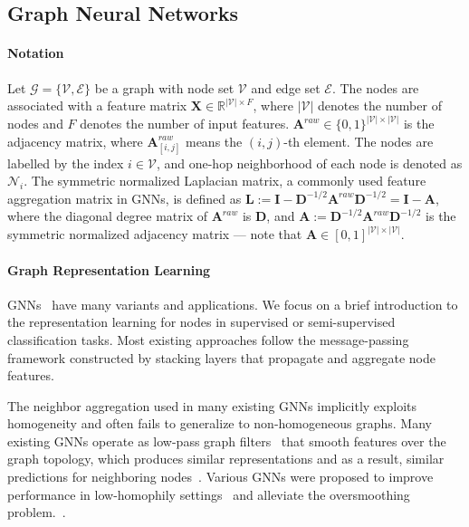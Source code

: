 \documentclass{article}
\theoremstyle{plain}
\theoremstyle{definition}
\theoremstyle{remark}
\begin{document}
\subsection{Graph Neural Networks}
\paragraph{Notation}
Let $\mathcal{G}=\{\mathcal{V}, \mathcal{E}\}$ be a graph with node set $\mathcal{V}$ and edge set $\mathcal{E}$. The nodes are associated with a feature matrix $\mathbf{X}\in \mathbb{R}^{|\mathcal{V}| \times F}$, where $|\mathcal{V}|$ denotes the number of nodes and $F$ denotes the number of input features. $\mathbf{A}^{raw}\in\{0,1\}^{|\mathcal{V}| \times |\mathcal{V}|}$ is the adjacency matrix, where $\mathbf{A}^{raw}_{[i,j]}$ means the $(i,j)$-th element. The nodes are labelled by the index $i\in \mathcal{V}$, and one-hop neighborhood of each node is denoted as $\mathcal{N}_i$. 
The symmetric normalized Laplacian matrix, a commonly used feature aggregation matrix in GNNs, is defined as $\mathbf{L} := \mathbf{I}-\mathbf{D}^{-1/2}\mathbf{A}^{raw}\mathbf{D}^{-1/2}=\mathbf{I}-\mathbf{A}$, where the diagonal degree matrix of $\mathbf{A}^{raw}$ is $\mathbf{D}$, and $\mathbf{A} := \mathbf{D}^{-1/2}\mathbf{A}^{raw}\mathbf{D}^{-1/2}$ is the symmetric normalized adjacency matrix --- note that $\mathbf{A} \in [0,1]^{|\mathcal{V}| \times |\mathcal{V}|}$.






\paragraph{Graph Representation Learning}
GNNs~\cite{kipf2017GCN,velickovic2018GAT,hamilton2017graphSAGE,Wu2019SGC,zhu2020ssgc} have many variants and applications. We focus on a brief introduction to the representation learning for nodes in supervised or semi-supervised classification tasks. Most existing approaches follow the message-passing framework constructed by stacking layers that propagate and aggregate node features.

The neighbor aggregation used in many existing GNNs implicitly exploits homogeneity and often fails to generalize to non-homogeneous graphs. Many existing GNNs operate as low-pass graph filters~\cite{balcilar2021analyzing} that smooth features over the graph topology, which produces similar representations and as a result, similar predictions for neighboring nodes~\cite{tiezzi2021deep,oono2020oversmoothing,li2018deeper}. Various GNNs were proposed to improve performance in low-homophily settings~\cite{pei2020geomGCN,abu2019mixhop,zhu2020h2gcn,chien2021GPRGNN,he2021bernnet,lim2022LINKX,luan2022ACMGCN,bodnar2022Sheaf,giovanni2022GRAFF,li2022GloGNN} and alleviate the oversmoothing problem.~\cite{xu2018jknet,chen2020gcnii,zhao2020pairnorm,rusch2022gcon}.
\end{document}

